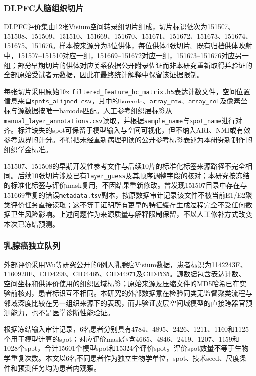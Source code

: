 \subsubsection{DLPFC人脑组织切片}
DLPFC评价集由12张Visium空间转录组切片组成，切片标识依次为151507、151508、151509、151510、151669、151670、151671、151672、151673、151674、151675、151676。样本按来源分为3位供体，每位供体4张切片。既有归档供体映射中，151507--151510对应一组，151669--151672对应一组，151673--151676对应另一组；部分早期切片的供体对应关系依据公开附录佐证而非本研究重新取得并验证的全部原始受试者元数据，因此在最终统计解释中保留该证据限制。

每张切片采用原始10x \texttt{filtered\_feature\_bc\_matrix.h5}表达计数文件，空间位置信息来自\texttt{spots\_aligned.csv}，其中的barcode、\texttt{array\_row}、\texttt{array\_col}及像素坐标与源数据按唯一barcode匹配。人工参考组织层标签从\texttt{manual\_layer\_annotations.csv}读取，并根据\texttt{sample\_name}与\texttt{spot\_name}进行对齐。标注缺失的spot可保留于模型输入与空间可视化，但不纳入ARI、NMI或有效参考边界的计分。不得把未经重新病理判读的公开参考标签表述为本研究新制作的组织学金标准。

151507、151508的早期开发性参考文件与后续10片的标准化标签来源路径不完全相同。后续10张切片涉及已有\texttt{layer\_guess}及其顺序调整字段的核对；本研究按冻结的标准化标签与评价mask复用，不因结果重新修改。曾发现151507目录中存在与151669重复的错误\texttt{metadata.tsv}副本，按原数据审计记录该文件不被当前E1/E2聚类评价任务直接读取；这不等于证明所有更早的特征缓存生成过程完全不受任何数据卫生风险影响。上述问题作为来源质量与解释限制保留，不以人工修补方式改变本次已冻结预测。

\subsubsection{乳腺癌独立队列}
外部评价采用Wu等研究公开的6例人乳腺癌Visium数据，患者标识为1142243F、1160920F、CID4290、CID4465、CID44971及CID4535。源数据包含表达计数、空间坐标和供评价使用的组织区域标签；原始来源及压缩文件的MD5哈希已在实验前核对，患者标识互不相同。本研究的外部数据意在检验同类无监督聚类流程与邻域深度比较在另一组织来源下的表现，而非验证皮层空间域模型的直接跨器官预测能力，也不是医学诊断性能验证。

根据冻结输入审计记录，6名患者分别具有4784、4895、2426、1211、1160和1125个用于模型计算的spot；对应评价mask包含4665、4846、2419、1207、1159和1028个spot，合计15601个模型spot和15324个评价spot。评价spot数量不等于生物学重复次数。本文以6名不同患者作为独立生物学单位，spot、技术seed、尺度条件和预测任务均为患者内观察。


